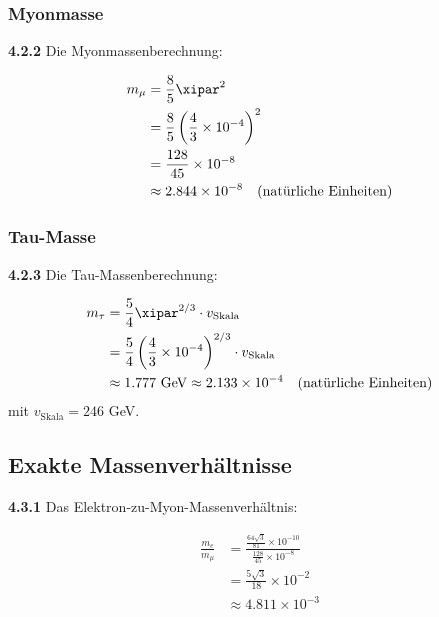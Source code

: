 	\subsubsection{Myonmasse}
	
	\noindent \textbf{4.2.2} Die Myonmassenberechnung:
	\begin{keyresult}
		\begin{align}
			m_\mu &= \frac{8}{5} \xipar^{2} \\
			&= \frac{8}{5} \left( \frac{4}{3} \times 10^{-4} \right)^{2} \\
			&= \frac{128}{45} \times 10^{-8} \\
			&\approx 2.844 \times 10^{-8} \quad \text{(natürliche Einheiten)}
		\end{align}
	\end{keyresult}
	
	\subsubsection{Tau-Masse}
	
	\noindent \textbf{4.2.3} Die Tau-Massenberechnung:
	\begin{keyresult}
		\begin{align}
			m_\tau &= \frac{5}{4} \xipar^{2/3} \cdot v_{\text{Skala}} \\
			&= \frac{5}{4} \left( \frac{4}{3} \times 10^{-4} \right)^{2/3} \cdot v_{\text{Skala}} \\
			&\approx 1.777 \text{ GeV} \approx 2.133 \times 10^{-4} \quad \text{(natürliche Einheiten)}
		\end{align}
		mit $v_{\text{Skala}} = 246$ GeV.
	\end{keyresult}
	
	\subsection{Exakte Massenverhältnisse}
	
	\noindent \textbf{4.3.1} Das Elektron-zu-Myon-Massenverhältnis:
	\begin{keyresult}
		\begin{align}
			\frac{m_e}{m_\mu} &= \frac{\frac{64 \sqrt{3}}{81} \times 10^{-10}}{\frac{128}{45} \times 10^{-8}} \\
			&= \frac{5 \sqrt{3}}{18} \times 10^{-2} \\
			&\approx 4.811 \times 10^{-3}
		\end{align}
	\end{keyresult}

